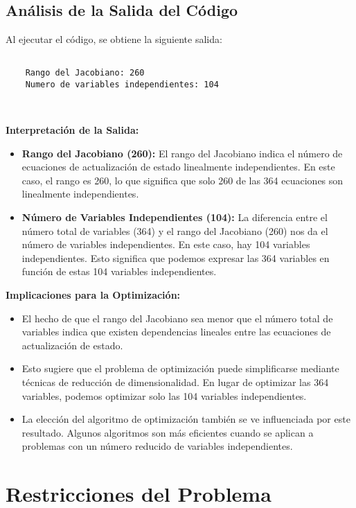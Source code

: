 \documentclass[fleqn]{article}
\begin{document}
\subsection{Análisis de la Salida del Código}

Al ejecutar el código, se obtiene la siguiente salida:

\begin{lstlisting}[style=salida]

    Rango del Jacobiano: 260
    Numero de variables independientes: 104
    
    
\end{lstlisting}

\textbf{Interpretación de la Salida:}

\begin{itemize}
    \item \textbf{Rango del Jacobiano (260):}  El rango del Jacobiano indica el número de ecuaciones de actualización de estado linealmente independientes. En este caso, el rango es 260, lo que significa que solo 260 de las 364 ecuaciones son linealmente independientes. 
    \item \textbf{Número de Variables Independientes (104):}  La diferencia entre el número total de variables (364) y el rango del Jacobiano (260) nos da el número de variables independientes. En este caso, hay 104 variables independientes. Esto significa que podemos expresar las 364 variables en función de estas 104 variables independientes.
\end{itemize}

\textbf{Implicaciones para la Optimización:}

\begin{itemize}
    \item El hecho de que el rango del Jacobiano sea menor que el número total de variables indica que existen dependencias lineales entre las ecuaciones de actualización de estado. 
    \item Esto sugiere que el problema de optimización puede simplificarse mediante técnicas de reducción de dimensionalidad. En lugar de optimizar las 364 variables, podemos optimizar solo las 104 variables independientes. 
    \item La elección del algoritmo de optimización también se ve influenciada por este resultado. Algunos algoritmos son más eficientes cuando se aplican a problemas con un número reducido de variables independientes. 
\end{itemize}


\section{Restricciones del Problema}
\end{document}
